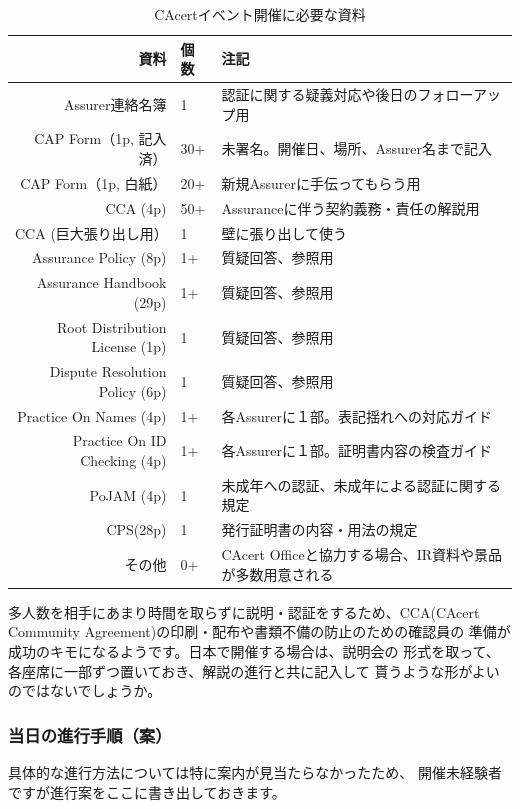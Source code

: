 \documentclass[mingoth,a4paper]{jsarticle}
\begin{document}
\begin{table}[H]
\begin{center}
\begin{tabular}{|r|l|p{25em}|}
\hline
資料 & 個数 & 注記 \\ \hline
Assurer連絡名簿 & 1 & 認証に関する疑義対応や後日のフォローアップ用 \\ \hline
CAP Form（1p, 記入済）& 30+ & 未署名。開催日、場所、Assurer名まで記入 \\ \hline
CAP Form（1p, 白紙）  & 20+ & 新規Assurerに手伝ってもらう用 \\ \hline
CCA (4p)              & 50+ & Assuranceに伴う契約義務・責任の解説用 \\ \hline
CCA (巨大張り出し用） & 1 & 壁に張り出して使う \\ \hline
Assurance Policy (8p)    & 1+ & 質疑回答、参照用 \\ \hline
Assurance Handbook (29p) & 1+ & 質疑回答、参照用 \\ \hline
Root Distribution License (1p) & 1 & 質疑回答、参照用 \\ \hline
Dispute Resolution Policy (6p) & 1 & 質疑回答、参照用 \\ \hline
Practice On Names (4p) & 1+ & 各Assurerに１部。表記揺れへの対応ガイド \\ \hline
Practice On ID Checking (4p) & 1+ & 各Assurerに１部。証明書内容の検査ガイド \\ \hline
PoJAM (4p) & 1 & 未成年への認証、未成年による認証に関する規定 \\ \hline
CPS(28p) & 1 & 発行証明書の内容・用法の規定 \\ \hline
その他 & 0+ & CAcert Officeと協力する場合、IR資料や景品が多数用意される \\ \hline
\end{tabular}
\end{center}
\caption{CAcertイベント開催に必要な資料}
\end{table}

多人数を相手にあまり時間を取らずに説明・認証をするため、CCA(CAcert
Community Agreement)の印刷・配布や書類不備の防止のための確認員の
準備が成功のキモになるようです。日本で開催する場合は、説明会の
形式を取って、各座席に一部ずつ置いておき、解説の進行と共に記入して
貰うような形がよいのではないでしょうか。

\subsubsection{当日の進行手順（案）}
具体的な進行方法については特に案内が見当たらなかったため、
開催未経験者ですが進行案をここに書き出しておきます。
\end{document}
